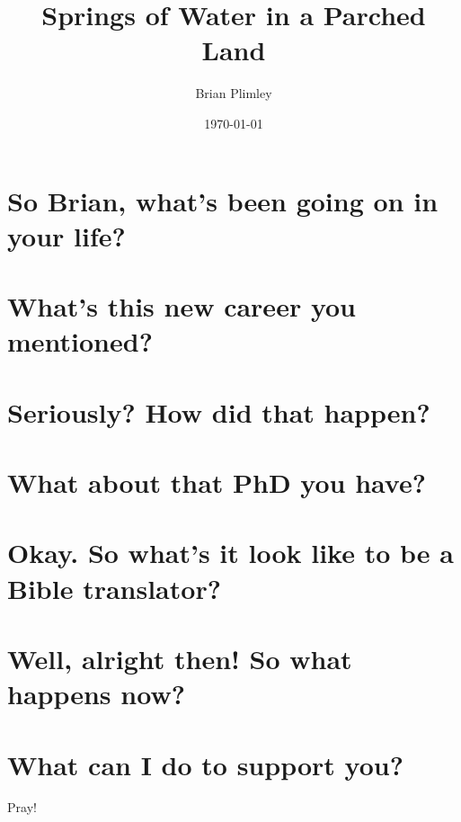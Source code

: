 \documentclass[letterpaper,twocolumn]{article}
\begin{document}
\title{Springs of Water in a Parched Land}
\author{Brian Plimley}
\date{\today}
\maketitle

\setcounter{secnumdepth}{0}	%

\section{So Brian, what's been going on in your life?}


\section{What's this new career you mentioned?}


\section{Seriously? How did that happen?}

\section{What about that PhD you have?}

\section{Okay. So what's it look like to be a Bible translator?}

\section{Well, alright then! So what happens now?}

\section{What can I do to support you?}

Pray!
\end{document}
